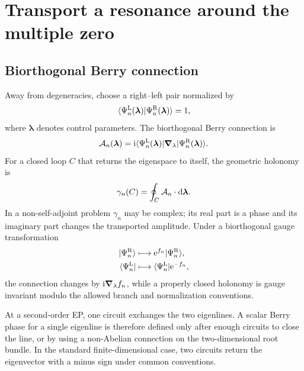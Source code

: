 \section{Transport a resonance around the multiple zero}
\label{sec:ep-holonomy}

\subsection{Biorthogonal Berry connection}
\label{subsec:biorthogonal-berry}

Away from degeneracies, choose a right--left pair normalized by
\begin{equation}
  \langle \Psi_n^{\mathrm L}(\bm\lambda)|
  \Psi_n^{\mathrm R}(\bm\lambda) \rangle=1 ,
  \label{eq:ep-normalization}
\end{equation}
where $\bm\lambda$ denotes control parameters.  The biorthogonal Berry
connection is
\begin{equation}
  \mathcal A_n(\bm\lambda)
  =\mathrm{i}\langle \Psi_n^{\mathrm L}(\bm\lambda) \rvert
  \bm\nabla_{\lambda}
  \lvert \Psi_n^{\mathrm R}(\bm\lambda) \rangle .
  \label{eq:biorthogonal-connection}
\end{equation}
For a closed loop $C$ that returns the eigenspace to itself, the geometric
holonomy is
\begin{equation}
  \gamma_n(C)=\oint_C\mathcal A_n\cdot\mathrm{d}\bm\lambda .
  \label{eq:berry-holonomy}
\end{equation}
In a non-self-adjoint problem $\gamma_n$ may be complex; its real part is a
phase and its imaginary part changes the transported amplitude.  Under a
biorthogonal gauge transformation
\begin{align}
  \lvert \Psi_n^{\mathrm R} \rangle&\longmapsto
  \mathrm{e}^{f_n}\lvert \Psi_n^{\mathrm R} \rangle,
  \notag\\
  \langle \Psi_n^{\mathrm L} \rvert&\longmapsto
  \langle \Psi_n^{\mathrm L} \rvert\mathrm{e}^{-f_n},
  \label{eq:biorthogonal-gauge}
\end{align}
the connection changes by $\mathrm{i}\bm\nabla_{\lambda}f_n$, while a properly
closed holonomy is gauge invariant modulo the allowed branch and normalization
conventions.

At a second-order EP, one circuit exchanges the two eigenlines.  A scalar
Berry phase for a single eigenline is therefore defined only after enough
circuits to close the line, or by using a non-Abelian connection on the
two-dimensional root bundle.  In the standard finite-dimensional case, two
circuits return the eigenvector with a minus sign under common conventions.

